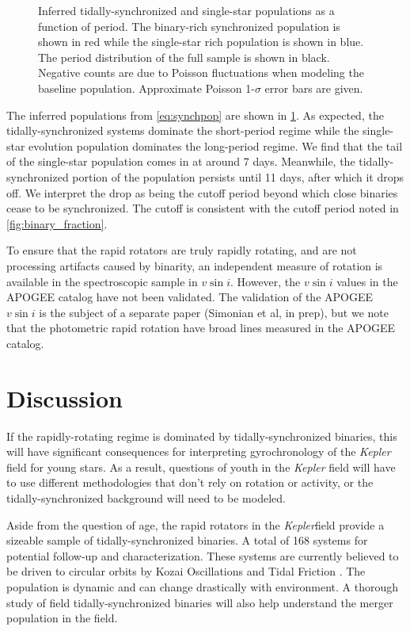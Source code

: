 \documentclass[manuscript]{aastex6}
\newcommand{\vsini}{\ensuremath{v \sin i}}
\newcommand{\Kepler}{\mbox{\textit{Kepler}}}
\begin{document}
\begin{figure}[htb]
    \centering
    \caption{Inferred tidally-synchronized and single-star populations as a
    function of period. The binary-rich synchronized population is shown in red
while the single-star rich population is shown in blue. The period distribution
of the full sample is shown in black. Negative counts are due to Poisson 
fluctuations when modeling the baseline population. Approximate Poisson 
1-\(\sigma\) error bars are given.}\label{fig:tsb_analysis}
\end{figure}

The inferred populations from \cref{eq:synchpop} are shown in
\cref{fig:tsb_analysis}. As expected, the tidally-synchronized systems dominate
the short-period regime while the single-star evolution population dominates
the long-period regime. We find that the tail of the single-star population
comes in at around 7 days. Meanwhile, the tidally-synchronized portion of the
population persists until 11 days, after which it drops off. We interpret the
drop as being the cutoff period beyond which close binaries cease to be
synchronized. The cutoff is consistent with the cutoff period noted in
\cref{fig:binary_fraction}.

To ensure that the rapid rotators are truly rapidly rotating, and
are not processing artifacts caused by binarity, an independent measure of
rotation is available in the spectroscopic sample in \vsini{}. However, the
\vsini{} values in the APOGEE catalog have not been validated. The validation
of the APOGEE \vsini{} is the subject of a separate paper (Simonian et al, in
prep), but we note that the photometric rapid rotation have broad lines
measured in the APOGEE catalog.

\section{Discussion}
\label{sec:discussion}

If the rapidly-rotating regime is dominated by tidally-synchronized binaries,
this will have significant consequences for interpreting gyrochronology of the
\Kepler{} field for young stars. As a result, questions of youth in the
\Kepler{} field will have to use different methodologies that don't rely on
rotation or activity, or the tidally-synchronized background will need to be
modeled. 

Aside from the question of age, the rapid rotators in the \Kepler field provide
a sizeable sample of tidally-synchronized binaries. A total of 168 systems for
potential follow-up and characterization. These systems are currently believed
to be driven to circular orbits by Kozai Oscillations and Tidal Friction
\citep{Fabrycky07}. The population is dynamic and can change drastically with
environment. A thorough study of field tidally-synchronized binaries will also
help understand the merger population in the field.
\end{document}
